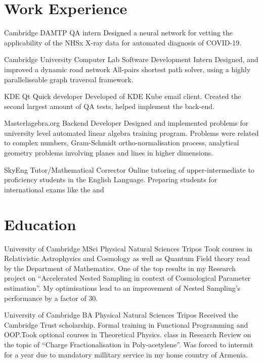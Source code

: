 \documentclass{CurriculumVitae}[10pt, draft, condensed]
\begin{document}
 \section*{Work Experience} {\setlength{\parindent}{0in}

    {Cambridge DAMTP} {QA intern} {Designed a neural network for
     vetting the applicability of the NHSx X-ray data for automated
     diagnosis of COVID-19. }

    {Cambridge
     University Computer Lab} {Software Development Intern} {Designed,
     and improved a dynamic road network All-pairs shortest path
     solver, using a highly paralleliseable graph traversal
     framework. }

    {KDE} {Qt Quick developer}
   {Developed of KDE Kube email client. Created the second largest
     amount of QA tests, helped implement the  back-end. }

    {Masterlagebra.org} {Backend Developer}
   {Designed and implemented problems for university level automated
     linear algebra training program. Problems were related to complex
     numbers, Gram-Schmidt ortho-normalisation process, analytical
     geometry problems involving planes and lines in higher
     dimensions. }

    {SkyEng}
   {Tutor/Mathematical Corrector} {Online tutoring of
     upper-intermediate to proficiency students in the English
     Language. Preparing students for international exams like the
       and }

\section*{Education}
 {University of Cambridge} {MSci } {
  Physical Natural Sciences Tripos} {Took courses in Relativistic
  Astrophysics and Cosmology as well as Quantum Field theory read by
  the Department of Mathematics. One of the top results in my Research
  project on ``Accelerated Nested Sampling in context of Cosmological
  Parameter estimation''. My optimisations lead to an improvement of
  Nested Sampling's performance by a factor of 30. }


 {University of Cambridge} {BA }{Physical Natural
  Sciences Tripos} {Received the Cambridge Trust scholarship. Formal
  training in Functional Programming and OOP.\@ Took optional courses
  in Theoretical Physics.  class in Research Review on the
  topic of ``Charge Fractionalisation in Poly-acetylene''. Was forced to
  intermit for a year due to mandatory millitary service in my home country of
  Armenia. }


}
\end{document}
